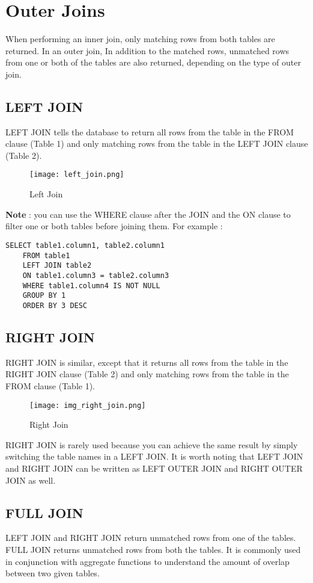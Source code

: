 \documentclass[12pt, letterpaper]{article}
\begin{document}
\section{Outer Joins}
When performing an inner join, only matching rows from both tables are returned. In an outer join, In addition to the matched rows, unmatched rows from one or both of the tables are also returned, depending on the type of outer join.

\subsection{LEFT JOIN}
LEFT JOIN tells the database to return all rows from the table in the FROM clause (Table 1) and only matching rows from the table in the LEFT JOIN clause (Table 2).

\begin{figure}[H]
    \centering
    \texttt{[image: left\_join.png]}
    \caption{Left Join}
    \label{leftjoin}
\end{figure}

\textbf{Note} : you can use the WHERE clause after the JOIN and the ON clause to filter one or both tables before joining them. For example : 

\begin{verbatim}
SELECT table1.column1, table2.column1
    FROM table1
    LEFT JOIN table2
    ON table1.column3 = table2.column3
    WHERE table1.column4 IS NOT NULL
    GROUP BY 1
    ORDER BY 3 DESC
\end{verbatim}

\subsection{RIGHT JOIN}
RIGHT JOIN is similar, except that it returns all rows from the table in the RIGHT JOIN clause (Table 2) and only matching rows from the table in the FROM clause (Table 1).

\begin{figure}[H]
    \centering
    \texttt{[image: img\_right\_join.png]}
    \caption{Right Join}
    \label{rightjoin}
\end{figure}

RIGHT JOIN is rarely used because you can achieve the same result by simply switching the table names in a LEFT JOIN. It is worth noting that LEFT JOIN and RIGHT JOIN can be written as LEFT OUTER JOIN and RIGHT OUTER JOIN as well.

\subsection{FULL JOIN}
LEFT JOIN and RIGHT JOIN return unmatched rows from one of the tables. FULL JOIN returns unmatched rows from both the tables. It is commonly used in conjunction with aggregate functions to understand the amount of overlap between two given tables.
\end{document}

